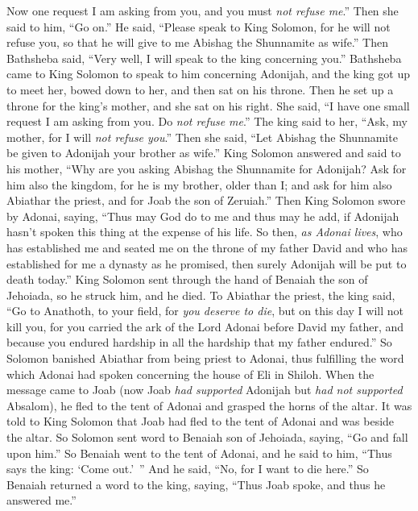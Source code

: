 \begin{biblechapter}
\verse Now one request I am asking from you, and you must \textit{not refuse me}.” Then she said to him, “Go on.”
\verse He said, “Please speak to King Solomon, for he will not refuse you, so that he will give to me Abishag the Shunnamite as wife.”
\verse Then Bathsheba said, “Very well, I will speak to the king concerning you.”
 Bathsheba came to King Solomon to speak to him concerning Adonijah, and the king got up to meet her, bowed down to her, and then sat on his throne. Then he set up a throne for the king’s mother, and she sat on his right.
\verse She said, “I have one small request I am asking from you. Do \textit{not refuse me}.” The king said to her, “Ask, my mother, for I will \textit{not refuse you}.”
\verse Then she said, “Let Abishag the Shunnamite be given to Adonijah your brother as wife.”
\verse King Solomon answered and said to his mother, “Why are you asking Abishag the Shunnamite for Adonijah? Ask for him also the kingdom, for he is my brother, older than I; and ask for him also Abiathar the priest, and for Joab the son of Zeruiah.”
\verse Then King Solomon swore by Adonai, saying, “Thus may God do to me and thus may he add, if Adonijah hasn’t spoken this thing at the expense of his life.
\verse So then, \textit{as Adonai lives}, who has established me and seated me on the throne of my father David and who has established for me a dynasty as he promised, then surely Adonijah will be put to death today.”
\verse King Solomon sent through the hand of Benaiah the son of Jehoiada, so he struck him, and he died.
\verse To Abiathar the priest, the king said, “Go to Anathoth, to your field, for \textit{you deserve to die}, but on this day I will not kill you, for you carried the ark of the Lord Adonai before David my father, and because you endured hardship in all the hardship that my father endured.”
\verse So Solomon banished Abiathar from being priest to Adonai, thus fulfilling the word which Adonai had spoken concerning the house of Eli in Shiloh.
\verse When the message came to Joab (now Joab \textit{had supported} Adonijah but \textit{had not supported} Absalom), he fled to the tent of Adonai and grasped the horns of the altar.
\verse It was told to King Solomon that Joab had fled to the tent of Adonai and was beside the altar. So Solomon sent word to Benaiah son of Jehoiada, saying, “Go and fall upon him.”
\verse So Benaiah went to the tent of Adonai, and he said to him, “Thus says the king: ‘Come out.’ ” And he said, “No, for I want to die here.” So Benaiah returned a word to the king, saying, “Thus Joab spoke, and thus he answered me.”

\end{biblechapter}
